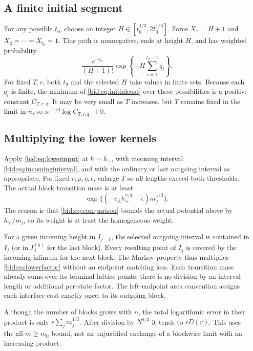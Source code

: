 \documentclass[11pt,letterpaper]{article}
\numberwithin{equation}{section}
\theoremstyle{remark}\newtheorem{remark}[theorem]{Remark}
\begin{document}
\subsection{A finite initial segment}
For any possible $t_0$, choose an integer
$H\in[t_0^{1/3},2t_0^{1/3}]$. Force $X_1=H+1$ and
$X_2=\cdots=X_{t_0}=1$. This path is nonnegative, ends at height $H$,
and has weighted probability
\begin{equation}\label{bid:eq:initialcost}
 \frac{e^{-t_0}}{(H+1)!}
       \exp\left\{-H\sum_{i=1}^{t_0-1}q_i\right\}.
\end{equation}
For fixed $T,r$, both $t_0$ and the selected $H$ take values in finite
sets. Because each $q_i$ is finite, the minimum of
\eqref{bid:eq:initialcost} over these possibilities is a positive constant
$C_{T,r,q}$. It may be very small as $T$ increases, but $T$ remains fixed
in the limit in $n$, so $n^{-1/3}\log C_{T,r,q}\to0$.

\subsection{Multiplying the lower kernels}
Apply \eqref{bid:eq:lowerinput} at $h=h_+$, with incoming interval
\eqref{bid:eq:incominginterval}, and with the ordinary or last outgoing
interval as appropriate. For fixed $r,\rho,\eta,\epsilon$, enlarge
$T$ so all lengths exceed both thresholds. The actual block transition
mass is at least
\begin{equation}\label{bid:eq:lowerfactor}
 \exp\{(-c_Ah_+^{2/3}-\epsilon)m_j^{1/3}\}.
\end{equation}
The reason is that \eqref{bid:eq:comparison} bounds the actual potential
above by $h_+/m_j$, so its weight is at least the homogeneous weight.

For a given incoming height in $I_{j-1}$, the selected outgoing interval
is contained in $I_j$ (or in $I_J^{(\eta)}$ for the last block). Every
resulting point of $I_j$ is covered by the incoming infimum for the next
block. The Markov property thus multiplies \eqref{bid:eq:lowerfactor} without
an endpoint matching loss. Each transition mass already sums over its
terminal lattice points; there is no division by an interval length or
additional per-state factor. The left-endpoint area convention assigns
each interface cost exactly once, to its outgoing block.

Although the number of blocks grows with $n$, the total logarithmic
error in their product is only
$\epsilon\sum_jm_j^{1/3}$. After division by $N^{1/3}$ it tends to
$\epsilon D(r)$. This uses the all-$m\geq m_0$ bound, not an unjustified
exchange of a blockwise limit with an increasing product.
\end{document}
